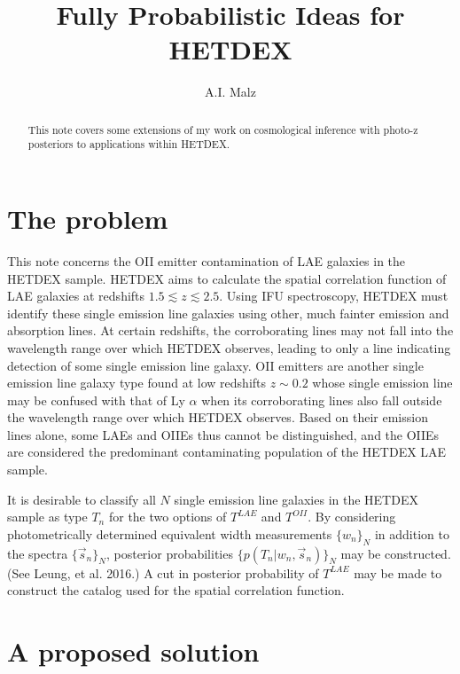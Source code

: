 \documentclass[12pt, onecolumn]{emulateapj}
\begin{document}
\title{Fully Probabilistic Ideas for HETDEX}

\author{A.I. Malz}

\begin{abstract}
This note covers some extensions of my work on cosmological inference with photo-z posteriors to applications within HETDEX.
\end{abstract}


\section{The problem}
\label{sec:intro}

This note concerns the OII emitter contamination of LAE galaxies in the HETDEX sample.  HETDEX aims to calculate the spatial correlation function of LAE galaxies at redshifts $1.5 \lesssim z \lesssim 2.5$.  Using IFU spectroscopy, HETDEX must identify these single emission line galaxies using other, much fainter emission and absorption lines.  At certain redshifts, the corroborating lines may not fall into the wavelength range over which HETDEX observes, leading to only a line indicating detection of some single emission line galaxy.  OII emitters are another single emission line galaxy type found at low redshifts $z \sim 0.2$ whose single emission line may be confused with that of Ly $\alpha$ when its corroborating lines also fall outside the wavelength range over which HETDEX observes.  Based on their emission lines alone, some LAEs and OIIEs thus cannot be distinguished, and the OIIEs are considered the predominant contaminating population of the HETDEX LAE sample.  

It is desirable to classify all $N$ single emission line galaxies in the HETDEX sample as type $T_{n}$ for the two options of $T^{LAE}$ and $T^{OII}$.  By considering photometrically determined equivalent width measurements $\{w_{n}\}_{N}$ in addition to the spectra $\{\vec{s}_{n}\}_{N}$, posterior probabilities $\{p(T_{n}|w_{n},\vec{s}_{n})\}_{N}$ may be constructed.  (See Leung, et al. 2016.)  A cut in posterior probability of $T^{LAE}$ may be made to construct the catalog used for the spatial correlation function.  

\section{A proposed solution}
\label{sec:confrac}
\end{document}
